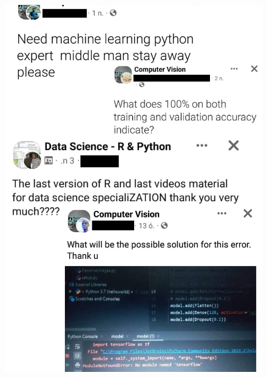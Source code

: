 \begin{frame}
\begin{columns}
\begin{column}{0.45\textwidth}
\begin{figure}
	\includegraphics[width=1.0\textwidth]{img/data-science-fb.png}
\end{figure}
\end{column}
\end{columns}

\end{frame}